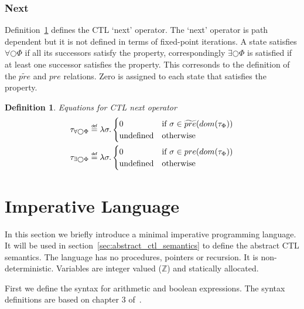 \documentclass[11pt,a4paper,titlepage]{article}
\newtheorem{definition}{Definition}[section]
\newcommand\eqdef{\mathrel{\overset{\makebox[0pt]{\mbox{\normalfont\tiny\sffamily def}}}{=}}}
\begin{document}
\subsubsection*{Next}

Definition~\ref{def:ctl_semantics_next} defines the CTL `next' operator. The `next' operator is path dependent but it 
is not defined in terms of fixed-point iterations. A state satisfies $\forall\bigcirc\Phi$ if all its successors satisfy the property,
correspondingly $\exists\bigcirc\Phi$ is satisfied if at least one successor satisfies the property. 
This corresonds to the definition of the $\widetilde{pre}$ and $pre$ relations. Zero is assigned to each state
that satisfies the property. 

\begin{definition}\label{def:ctl_semantics_next}
    Equations for CTL next operator
    \setlength{\jot}{15pt}
    \begin{align}
        \tau_{\forall\bigcirc\Phi} &\eqdef \lambda \sigma.
        \begin{cases}
            0                   & \text{if} \ \sigma \in \widetilde{pre}(dom(\tau_\Phi)) \\
            \text{undefined}    & \text{otherwise}
        \end{cases}\\
        \tau_{\exists\bigcirc\Phi} &\eqdef \lambda \sigma.
        \begin{cases}
            0                   & \text{if} \ \sigma \in pre(dom(\tau_\Phi)) \\
            \text{undefined}    & \text{otherwise}
        \end{cases}
    \end{align}
\end{definition}


\section{Imperative Language}\label{sec:imperative_language}

In this section we briefly introduce a minimal imperative programming language. 
It will be used in section~\ref{sec:abstract_ctl_semantics} to define the abstract CTL semantics.
The language has no procedures, pointers or recursion. It is non-deterministic.
Variables are integer valued ($\mathbb{Z}$) and statically allocated. 


First we define the syntax for arithmetic and boolean expressions. 
The syntax definitions are based on chapter 3 of~\cite{UrbanPhd}.
\end{document}
